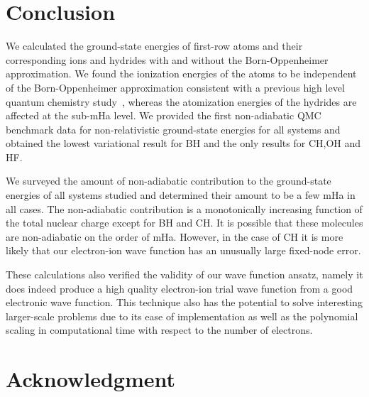 \documentclass[pra,superscriptaddress,groupedaddress,twocolumn]{revtex4}
\begin{document}
\section{Conclusion}
We calculated the ground-state energies of first-row atoms and their corresponding ions and hydrides with and without the Born-Oppenheimer approximation. We found the ionization energies of the atoms to be independent of the Born-Oppenheimer approximation consistent with a previous high level quantum chemistry study~\cite{Klopper_IP}, whereas the atomization energies of the hydrides are affected at the sub-mHa level. We provided the first non-adiabatic QMC benchmark data for non-relativistic ground-state energies for all systems and obtained the lowest variational result for BH and the only results for CH,OH and HF.

We surveyed the amount of non-adiabatic contribution to the ground-state energies of all systems studied and determined their amount to be a few mHa in all cases. The non-adiabatic contribution is a monotonically increasing function of the total nuclear charge except for BH and CH. It is possible that these molecules are non-adiabatic on the order of mHa. However, in the case of CH it is more likely that our electron-ion wave function has an unusually large fixed-node error.

These calculations also verified the validity of our wave function ansatz, namely it does indeed produce a high quality electron-ion trial wave function from a good electronic wave function. This technique also has the potential to solve interesting larger-scale problems due to its ease of implementation as well as the polynomial scaling in computational time with respect to the number of electrons.  %

\section{Acknowledgment}



\end{document}
